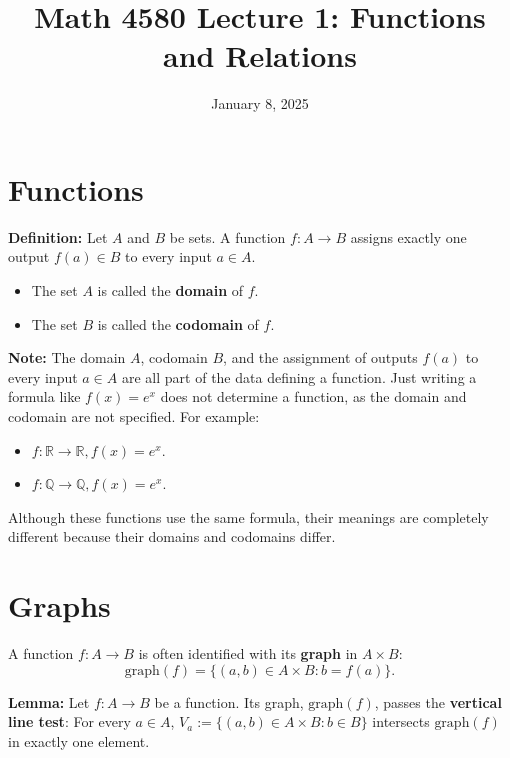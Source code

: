 \documentclass{article}
\begin{document}
\title{Math 4580 Lecture 1: Functions and Relations}
\date{January 8, 2025}
\maketitle

\section*{Functions}
\textbf{Definition:} Let $A$ and $B$ be sets. A function $f: A \to B$ assigns exactly one output $f(a) \in B$ to every input $a \in A$. 
\begin{itemize}
    \item The set $A$ is called the \textbf{domain} of $f$.
    \item The set $B$ is called the \textbf{codomain} of $f$.
\end{itemize}

\textbf{Note:} The domain $A$, codomain $B$, and the assignment of outputs $f(a)$ to every input $a \in A$ are all part of the data defining a function. Just writing a formula like $f(x) = e^x$ does not determine a function, as the domain and codomain are not specified. For example:
\begin{itemize}
    \item $f: \mathbb{R} \to \mathbb{R}, f(x) = e^x$.
    \item $f: \mathbb{Q} \to \mathbb{Q}, f(x) = e^x$.
\end{itemize}
Although these functions use the same formula, their meanings are completely different because their domains and codomains differ.

\section*{Graphs}
A function $f: A \to B$ is often identified with its \textbf{graph} in $A \times B$:
\[ \text{graph}(f) = \{(a, b) \in A \times B : b = f(a)\}. \]

\textbf{Lemma:} Let $f: A \to B$ be a function. Its graph, $\text{graph}(f)$, passes the \textbf{vertical line test}: For every $a \in A$, $V_a := \{(a, b) \in A \times B : b \in B\}$ intersects $\text{graph}(f)$ in exactly one element.

\begin{center}
\end{center}
\end{document}
